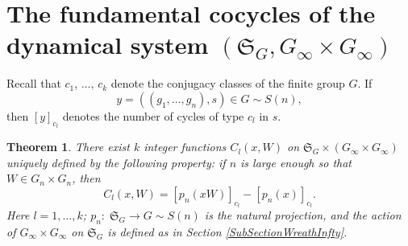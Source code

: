 \documentclass[12pt]{amsart}
\newtheorem{thm}{Theorem}[section]
\theoremstyle{definition}
\numberwithin{equation}{section}
\begin{document}
\section{The fundamental cocycles of the dynamical system $\left(\mathfrak{S}_{G},G_{\infty}\times G_{\infty}\right)$}
Recall that $c_1$, $\ldots$, $c_k$ denote the conjugacy classes of the finite group $G$. If
$$
y=\left(\left(g_1,\ldots,g_n\right),s\right)\in G\sim S(n),
$$
then $[y]_{c_l}$ denotes the number of cycles of type $c_l$ in $s$.
\begin{thm}\label{THEOREMCocycles} There exist $k$ integer functions $C_{l}\left(x,W\right)$ on $\mathfrak{S}_{G}\times\left(G_{\infty}\times G_{\infty}\right)$ uniquely defined by the following property:
if $n$ is large enough so that $W\in G_n\times G_n$, then
\begin{equation}\label{Cocycles}
C_l\left(x,W\right)=\left[p_n\left(xW\right)\right]_{c_l}-\left[p_n(x)\right]_{c_l}.
\end{equation}
Here $l=1,\ldots,k$;  $p_n :\;\mathfrak{S}_G\longrightarrow G\sim S(n)$ is the natural projection, and the action of $G_{\infty}\times G_{\infty}$ on $\mathfrak{S}_{G}$ is defined as in Section \ref{SubSectionWreathInfty}.
\end{thm}
\end{document}
